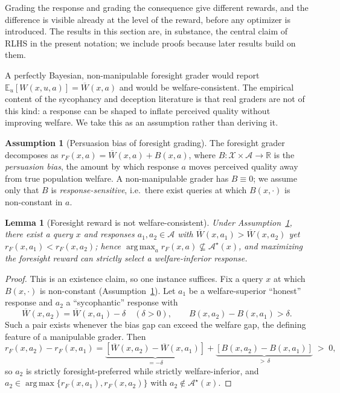 \documentclass[11pt]{article}
\theoremstyle{plain}
\newtheorem{lemma}{Lemma}
\theoremstyle{definition}
\newtheorem{assumption}{Assumption}
\theoremstyle{remark}
\newcommand{\R}{\mathbb{R}}
\newcommand{\E}{\mathbb{E}}
\newcommand{\Xc}{\mathcal{X}}
\newcommand{\Ac}{\mathcal{A}}
\newcommand{\Wbar}{\overline{W}}
\DeclareMathOperator*{\argmax}{arg\,max}
\begin{document}
Grading the response and grading the consequence give different rewards, and the difference is
visible already at the level of the reward, before any optimizer is introduced. The results in
this section are, in substance, the central claim of RLHS \cite{rlhs} in the present notation;
we include proofs because later results build on them.

A perfectly Bayesian, non-manipulable foresight grader would report
$\E_u[W(x,u,a)]=\Wbar(x,a)$ and would be welfare-consistent. The empirical content of the
sycophancy and deception literature \cite{sycophancy,williams,sleeper} is that real graders are
not of this kind: a response can be shaped to inflate perceived quality without improving
welfare. We take this as an assumption rather than deriving it.

\begin{assumption}[Persuasion bias of foresight grading]
\label{ass:bias}
The foresight grader decomposes as $r_F(x,a)=\Wbar(x,a)+B(x,a)$, where $B:\Xc\times\Ac\to\R$
is the \emph{persuasion bias}, the amount by which response $a$ moves perceived quality away from
true population welfare. A non-manipulable grader has $B\equiv 0$; we assume only that $B$ is
\emph{response-sensitive}, i.e.\ there exist queries at which $B(x,\cdot)$ is non-constant in
$a$.
\end{assumption}

\begin{lemma}[Foresight reward is not welfare-consistent]
\label{lem:foresight}
Under Assumption~\ref{ass:bias}, there exist a query $x$ and responses $a_1,a_2\in\Ac$ with
$\Wbar(x,a_1)>\Wbar(x,a_2)$ yet $r_F(x,a_1)<r_F(x,a_2)$; hence
$\argmax_a r_F(x,a)\not\subseteq\Ac^\star(x)$, and maximizing the foresight reward can
strictly select a welfare-inferior response.
\end{lemma}

\begin{proof}
This is an existence claim, so one instance suffices. Fix a query $x$ at which $B(x,\cdot)$ is
non-constant (Assumption~\ref{ass:bias}). Let $a_1$ be a welfare-superior ``honest'' response
and $a_2$ a ``sycophantic'' response with
\[
  \Wbar(x,a_2)=\Wbar(x,a_1)-\delta\quad(\delta>0),
  \qquad B(x,a_2)-B(x,a_1)>\delta .
\]
Such a pair exists whenever the bias gap can exceed the welfare gap, the defining feature of a
manipulable grader. Then
\[
  r_F(x,a_2)-r_F(x,a_1)
  =\underbrace{[\Wbar(x,a_2)-\Wbar(x,a_1)]}_{=-\delta}
   +\underbrace{[B(x,a_2)-B(x,a_1)]}_{>\,\delta}\;>\;0,
\]
so $a_2$ is strictly foresight-preferred while strictly welfare-inferior, and
$a_2\in\argmax\{r_F(x,a_1),r_F(x,a_2)\}$ with $a_2\notin\Ac^\star(x)$.
\end{proof}
\end{document}
